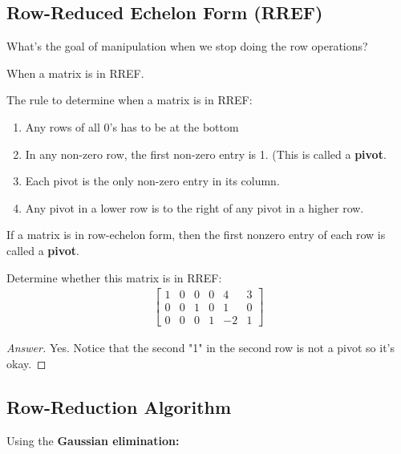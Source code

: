 \documentclass{package/notes}
\begin{document}
\subsection{Row-Reduced Echelon Form (RREF)}

What's the goal of manipulation when we stop doing the row operations?

When a matrix is in RREF.

The rule to determine when a matrix is in RREF:


\begin{enumerate}
    \item Any rows of all 0’s has to be at the bottom
    \item In any non-zero row, the first non-zero entry is 1. (This is called a \textbf{pivot}.
    \item Each pivot is the only non-zero entry in its column.
    \item Any pivot in a lower row is to the right of any pivot in a higher row.
\end{enumerate}

\begin{definition}[Pivot]

    If a matrix is in row-echelon form, then the first nonzero entry of each row is called a \textbf{pivot}.
\end{definition}

\begin{problem}
    Determine whether this matrix is in RREF:
\begin{align*}       
\left[              
\begin{array}{cccccc}   
1 & 0 & 0 & 0 & 4 & 3\\
0 & 0 & 1 & 0 & 1 & 0\\
0 & 0 & 0 & 1 & -2 & 1
\end{array}
\right]            
\end{align*}

\end{problem}

\begin{proof}[Answer]
Yes. Notice that the second "1" in the second row is not a pivot so it's okay.
\end{proof}

\subsection{Row-Reduction Algorithm}
Using the \textbf{Gaussian elimination:}
\end{document}
